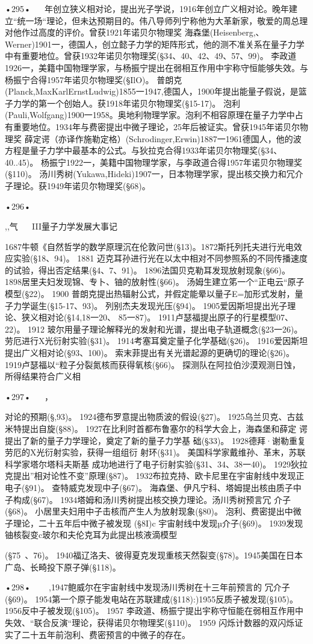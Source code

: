 •295•
  
年创立狭义相对论，提出光子学说，1916年创立广义相对论。晚年建立“统一场“理论，但未达预期目的。伟八导师列宁称他为大革新家，敬爱的周总理对他作过高度的评价。曾获1921年诺贝尔物理奖
海森堡(Heisenberg,、Werner)1901一，德国人，创立懿子力学的矩阵形式，他的测不准关系在量子力学中有重要地位。曾获1932年诺贝尔物理奖(§34、40、42、49、57、99)。
李政道1926一，美籍中国物理学家，与杨振宁提出在弱相互作用中宇称守恒能够失效。与杨振宁合得1957年诺贝尔物理奖(§IlO)。
普朗克(Planck,MaxKarlErnstLudwig)1855一1947,德国人，1900年提出能量子假说，是篮子力学的第一个创始人。获1918年诺贝尔物理奖(§15-17)。
泡利(Pauli,Wolfgang)1900一1958。奥地利物理学家。泡利不相容原理在量子力学中占有重要地位。1934年与费密提出中微子理论，25年后被证实。曾获1945年诺贝尔物理奖
薛定谔（亦译作施勒定格）(Schrodinger,Erwin)1887一1961德国人，他的波方程是量子力学中最基本的公式。与狄拉克合得1933年诺贝尔物理奖(§34、40..45)。
杨振宁1922一，美籍中国物理学家，与李政道合得1957年诺贝尔物理奖(§110)。
汤川秀树(Yukawa,Hideki)1907一，日本物理学家，提出核交换力和冗介子理论。获1949年诺贝尔物理奖(§68)。

•296•
 

,,气
  
III量子力学发展大事记

1687牛顿《自然哲学的数学原理沉在伦敦问世(§13)。1872斯托列托夫进行光电效应实验(§18、94)。
	1881	迈克耳孙进行光在以太中相对不同参照系的不同传播速度的试验，得出否定结果(§4、7、91)。
1896法国贝克勒耳发现放射现象(§66)。
1898居里夫妇发现锦、专卜、铀的放射性(§66)。
汤姆生建立笫一个“正电云“原子模型(§22)。
	1900	普朗克提出热辐射公式，并假定能晕以量子E=加形式发射，量子力学诞生(§15-17、93)。
列别杰夫发现光压(§94)。
1905爱因斯坦提出光子理论、狭义相对论(§14,18一20、
85一87)。
1911卢瑟福提出原子的行星模型07、22)。
	1912	玻尔用量子理论解释光的发射和光谱，提出电子轨道概念(§23一26)。
劳厄进行X光衍射实验(§31)。
1914考塞耳奠定量子化学基础(§26)。
1916爱因斯坦提出广义相对论(§93、100)。
索末菲提出有关光谱起源的更确切的理论(§26)。
1919卢瑟福以“粒子分裂氮核而获得氧核(§66)。
探测队在阿拉伯沙漠观测日蚀，所得结果符合广义相

•297•
  
，
 

对论的预期(§,93)。
1924德布罗意提出物质波的假设(§27)。
1925乌兰贝克、古兹米特提出自旋(§88)。
1927在比利时首都布鲁塞尔的科学大会上，海森堡和薛定
谔提出了新的量子力学理论，奠定了新的量子力学基
础(§33)。
1928德拜·谢勒重复劳厄的X光衍射实验，获得一组组衍
射环(§31)。
美国科学家戴维孙、革末，苏联科学家塔尔塔科夫斯基
成功地进行了电子衍射实验(§31、34、38一40)。
1929狄拉克提出”相对论性不变”原理(§87)。
1932布拉克持、欧卡尼里在宇宙射线中发现正电子(§91)。
查特威克发现中子(§67)。
海森堡、伊凡宁科、塔姆提出核由质子中子构成(§67)。
1934塔姆和汤川秀树提出核交换力理论。汤川秀树预言冗
介子(§68)。
小居里夫妇用中子击核而产生人为放射现象(§80)。
泡利、费密提出中微子理论，二十五年后中微子被发现
(§8I)c
宇宙射线中发现µ介子(§69)。
1939发现铀核裂变c玻尔和夫伦克耳为此提出核液滴模型

(§75~、76)。
1940福辽洛夫、彼得夏克发现重核天然裂变(§78)。1945美国在日本广岛、长畸投下原子弹(§118)。

•298•
  
~,1947鲍威尔在宇宙射线中发现汤川秀树在十三年前预言的
冗介子(§69)。
1954第一个原子能发电站在苏联建成(§118):)1955反质子被发现(§105)。
1956反中子被发现(§105)。
	1957	李政道、杨振宁提出宇称守恒能在弱相互作用中失效、“联合反演“理论，获得诺贝尔物理奖(§110)。
	1959	闪烁计数器的双闪烁证实了二十五年前泡利、费密预言的中微子的存在。

